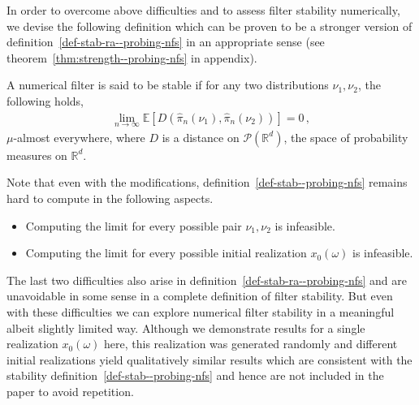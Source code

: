{\begin{itemize}
\end{itemize}
In order to overcome above difficulties and to assess filter stability numerically, we devise the following definition which can be proven to be a stronger version of definition~\ref{def-stab-ra--probing-nfs} in an appropriate sense (see theorem~\ref{thm:strength--probing-nfs} in appendix).
\begin{defn}A numerical filter is said to be stable if for any two distributions {$\nu_1, \nu_2$}, the following holds, 
\begin{align}
    {\lim_{n\to\infty}\mathbb E[D(\hat\pi_n(\nu_1), \hat\pi_n(\nu_2))]} = 0 \,,
\label{eq-stablaw--probing-nfs} \end{align}
$\mu$-almost everywhere, where $D$ is a distance on $\mathcal P(\mathbb R^d)$, the space of probability measures on $\mathbb R^d$.
\label{def-stab--probing-nfs} \end{defn}

Note that even with the modifications, definition~\ref{def-stab--probing-nfs} remains hard to compute in the following aspects.
\begin{itemize}
    \item Computing the limit for every possible pair $\nu_1, \nu_2$ is infeasible.
    \item Computing the limit for every possible initial realization $x_0(\omega)$ is infeasible.
\end{itemize}

The last two difficulties also arise in definition~\ref{def-stab-ra--probing-nfs} and are unavoidable in some sense in a complete definition of filter stability. But even with these difficulties we can explore numerical filter stability in a meaningful albeit slightly limited way.  Although we demonstrate results for a single realization $x_0(\omega)$ here, this realization was generated randomly and different initial realizations yield qualitatively similar results which are consistent with the stability definition~\ref{def-stab--probing-nfs} and hence are not included in the paper to avoid repetition.
}

